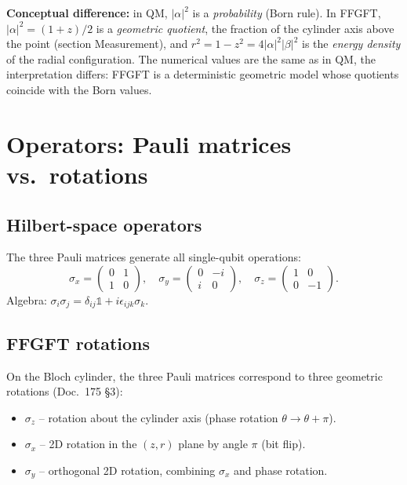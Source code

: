 \textbf{Conceptual difference:} in QM, $|\alpha|^2$ is a
\emph{probability} (Born rule). In FFGFT, $|\alpha|^2 = (1+z)/2$ is
a \emph{geometric quotient}, the fraction of the cylinder axis above
the point (section Measurement), and
$r^2 = 1 - z^2 = 4|\alpha|^2|\beta|^2$ is the \emph{energy density} of
the radial configuration. The numerical values are the same as in QM,
the interpretation differs: FFGFT is a deterministic geometric model
whose quotients coincide with the Born values.

\section{Operators: Pauli matrices vs.\ rotations}

\subsection{Hilbert-space operators}

The three Pauli matrices generate all single-qubit operations:
\begin{equation}
  \sigma_x = \begin{pmatrix}0 & 1 \\ 1 & 0\end{pmatrix},
  \quad
  \sigma_y = \begin{pmatrix}0 & -i \\ i & 0\end{pmatrix},
  \quad
  \sigma_z = \begin{pmatrix}1 & 0 \\ 0 & -1\end{pmatrix}.
\end{equation}
Algebra: $\sigma_i \sigma_j = \delta_{ij} \mathbb{1} + i\epsilon_{ijk}\sigma_k$.

\subsection{FFGFT rotations}

On the Bloch cylinder, the three Pauli matrices correspond to three
geometric rotations (Doc.~175 §3):
\begin{itemize}[leftmargin=2em,itemsep=2pt,topsep=2pt]
  \item $\sigma_z$ -- rotation about the cylinder axis (phase rotation $\theta \to \theta + \pi$).
  \item $\sigma_x$ -- 2D rotation in the $(z, r)$ plane by angle $\pi$ (bit flip).
  \item $\sigma_y$ -- orthogonal 2D rotation, combining $\sigma_x$ and phase rotation.
\end{itemize}

